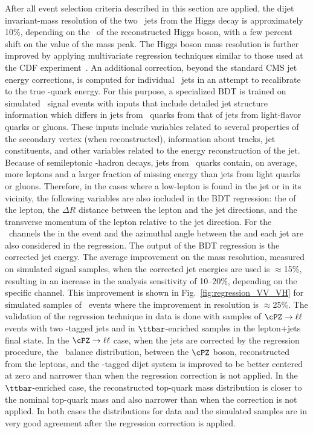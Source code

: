 \documentclass[11pt,twoside,a4paper,cmspaper,final,collab]{cms-tdr}
\begin{document}
After all
event selection criteria described in this section are applied, the
dijet invariant-mass resolution of the two \cPqb\ jets from the Higgs decay is
approximately 10\%, depending on the \pt\ of the reconstructed Higgs boson,
with a few percent shift on the value of the mass peak. The Higgs boson mass resolution
is further improved by applying multivariate regression techniques similar to those used at
the CDF experiment~\cite{1107.3026}. An additional correction, beyond the
standard CMS jet energy corrections, is computed for
individual \cPqb\ jets in an attempt to recalibrate to the true \cPqb-quark
energy. For this purpose, a specialized BDT is trained on
simulated \HBB\ signal events with
inputs that include detailed  jet structure information
which differs in jets from \cPqb\ quarks from that of jets from light-flavor
quarks or gluons.
These inputs include variables related to several properties of the secondary vertex
(when reconstructed), information about tracks, jet constituents, and
other variables related to the energy reconstruction of the jet.
Because of semileptonic \cPqb-hadron decays, jets from \cPqb\ quarks contain, on average, more leptons and a larger
fraction of missing energy than jets from light quarks or gluons. Therefore,
in the cases where a low-\pt lepton is found in the jet or in its
vicinity, the following variables are also included in the
BDT regression: the \pt
of the lepton, the $\Delta R$ distance between the lepton and the jet
directions, and the
transverse momentum
of the lepton relative to the jet direction. For the \ZllH\ channels the \MET in the event and the azimuthal angle
between the \MET and each jet are also considered in the regression.
The output of the BDT regression is the corrected jet energy.
The average improvement on the mass resolution, measured on simulated
signal samples, when the corrected jet energies
are used is $\approx$15\%, resulting in an increase in the analysis sensitivity of
10--20\%, depending on the specific channel. This improvement is shown
in Fig.~\ref{fig:regression_VV_VH} for simulated samples of \ZllHbb\ events where the improvement in resolution is $\approx$25\%. The
validation of the regression technique in data is done with samples of
$\cPZ\to\ell\ell$ events with two \cPqb-tagged jets and in  $\ttbar$-enriched samples in the lepton+jets final state. In the $\cPZ\to\ell\ell$ case, when the jets are corrected by
  the regression procedure, the \pt\ balance distribution, between the
  $\cPZ$ boson, reconstructed from the leptons, and the \cPqb-tagged dijet
  system is improved to be better centered at zero and narrower than
  when the regression correction is not applied. In the  $\ttbar$-enriched case, the reconstructed top-quark mass distribution is closer to the nominal top-quark mass
  and also narrower than when the correction is not applied. In both
  cases the distributions for data and the simulated samples are
  in very good agreement after the regression correction is applied.
\end{document}
